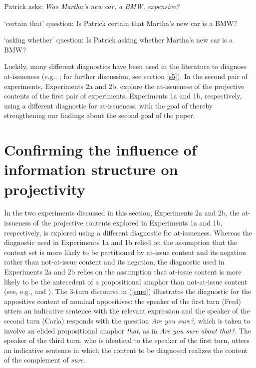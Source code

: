 \documentclass[11pt,fleqn]{article}
\newcommand{\6}{\mbox{$[\hspace*{-.6mm}[$}}
\newcommand{\9}{\mbox{$]\hspace*{-.6mm}]$}}
\begin{document}
\begin{exe}

\exi{(\ref{stim})} Patrick asks: {\em Was Martha's new car, a BMW, expensive?} 

\begin{xlist}
\ex `certain that' question: Is Patrick certain that Martha's new car is a BMW?

\ex `asking whether' question: Is Patrick asking whether Martha's new car is a BMW?

\end{xlist}

\end{exe}
Luckily, many different diagnostics have been used in the literature to diagnose at-issueness (e.g., \citealt{tonhauser-sula6}; for further discussion, see section \ref{s5}). In the second pair of experiments, Experiments 2a and 2b, explore the at-issueness of the projective contents of the first pair of experiments, Experiments 1a and 1b, respectively, using a different diagnostic for at-issueness, with the goal of thereby strengthening our findings about the second goal of the paper. 


\section{Confirming the influence of information structure on projectivity}\label{s4}

In the two experiments discussed in this section, Experiments 2a and 2b, the at-issueness of the projective contents explored in Experiments 1a and 1b, respectively, is explored using a different diagnostic for at-issueness. Whereas the diagnostic used in Experiments 1a and 1b relied on the assumption that the context set is more likely to be partitioned by at-issue content and its negation rather than not-at-issue content and its negation, the diagnostic used in Experiments 2a and 2b relies on the assumption that at-issue content is more likely to be the antecedent of a propositional anaphor than not-at-issue content (see, e.g., \citealt[54]{potts05} and \citealt{tonhauser-sula6}). The 3-turn discourse in (\ref{sure}) illustrates the diagnostic for the appositive content of nominal appositives: the speaker of the first turn (Fred) utters an indicative sentence with the relevant expression and the speaker of the second turn (Carla) responds with the question {\em Are you sure?}, which is taken to involve an elided propositional anaphor {\em that}, as in {\em Are you sure about that?}. The speaker of the third turn, who is identical to the speaker of the first turn, utters an indicative sentence in which the content to be diagnosed realizes the content of the complement of {\em sure}. 
\end{document}

